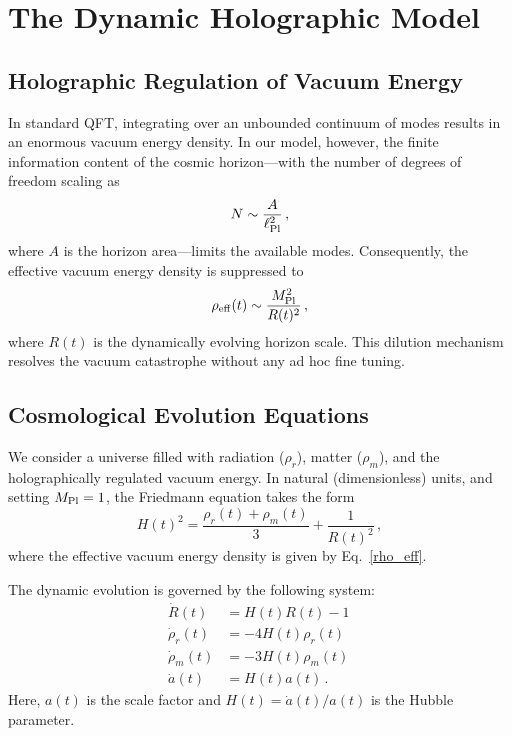 \documentclass[12pt]{article}
\begin{document}
\section{The Dynamic Holographic Model}

\subsection{Holographic Regulation of Vacuum Energy}
In standard QFT, integrating over an unbounded continuum of modes results in an enormous vacuum energy density. In our model, however, the finite information content of the cosmic horizon---with the number of degrees of freedom scaling as
\[
N \sim \frac{A}{\ell_{\rm Pl}^2} \,,
\]
where $A$ is the horizon area---limits the available modes. Consequently, the effective vacuum energy density is suppressed to 
\begin{equation}
\rho_{\rm eff}(t) \sim \frac{M_{\rm Pl}^2}{R(t)^2}\,,
\label{rho_eff}
\end{equation}
where $R(t)$ is the dynamically evolving horizon scale. This dilution mechanism resolves the vacuum catastrophe without any ad hoc fine tuning.

\subsection{Cosmological Evolution Equations}
We consider a universe filled with radiation ($\rho_r$), matter ($\rho_m$), and the holographically regulated vacuum energy. In natural (dimensionless) units, and setting $M_{\rm Pl}=1$, the Friedmann equation takes the form
\begin{equation}
H(t)^2 = \frac{\rho_r(t) + \rho_m(t)}{3} + \frac{1}{R(t)^2}\,,
\label{friedmann}
\end{equation}
where the effective vacuum energy density is given by Eq.~\eqref{rho_eff}.

The dynamic evolution is governed by the following system:
\begin{align}
\dot{R}(t) &= H(t) R(t) - 1\,\\%
\dot{\rho}_r(t) &= -4H(t) \rho_r(t)\,\\%
\dot{\rho}_m(t) &= -3H(t) \rho_m(t)\,\\%
\dot{a}(t) &= H(t) a(t)\,.
\end{align}
Here, $a(t)$ is the scale factor and $H(t) = \dot{a}(t)/a(t)$ is the Hubble parameter.
\end{document}
